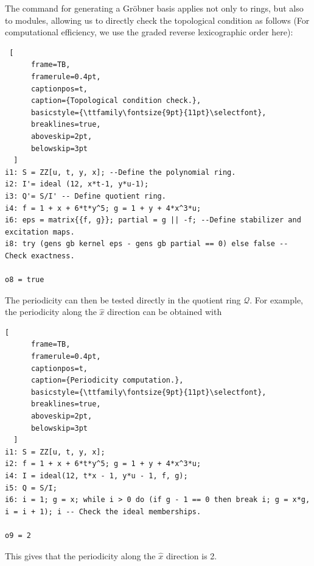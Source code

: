 \documentclass[aps,prb,english,superscriptaddress,twocolumn,tightenlines,showpacs,longbibliography,floatfix,amsfonts]{revtex4-2}
\begin{document}
The command for generating a Gr\"{o}bner basis applies not only to rings, but also to modules, allowing us to directly check the topological condition as follows (For computational efficiency, we use the graded reverse lexicographic order here):
\begin{lstlisting} [
      frame=TB,             
      framerule=0.4pt,
      captionpos=t,
      caption={Topological condition check.},
      basicstyle={\ttfamily\fontsize{9pt}{11pt}\selectfont},
      breaklines=true,
      aboveskip=2pt,        
      belowskip=3pt
  ]
i1: S = ZZ[u, t, y, x]; --Define the polynomial ring.
i2: I'= ideal (12, x*t-1, y*u-1);
i3: Q'= S/I' -- Define quotient ring.
i4: f = 1 + x + 6*t*y^5; g = 1 + y + 4*x^3*u;
i6: eps = matrix{{f, g}}; partial = g || -f; --Define stabilizer and excitation maps.
i8: try (gens gb kernel eps - gens gb partial == 0) else false -- Check exactness. 

o8 = true
\end{lstlisting}

The periodicity can then be tested directly in the quotient ring $\mathcal{Q}$. For example, the periodicity along the $\hat{x}$ direction can be obtained with
\begin{lstlisting}[
      frame=TB,             
      framerule=0.4pt,
      captionpos=t,
      caption={Periodicity computation.},
      basicstyle={\ttfamily\fontsize{9pt}{11pt}\selectfont},
      breaklines=true,
      aboveskip=2pt,        
      belowskip=3pt
  ]
i1: S = ZZ[u, t, y, x];
i2: f = 1 + x + 6*t*y^5; g = 1 + y + 4*x^3*u; 
i4: I = ideal(12, t*x - 1, y*u - 1, f, g); 
i5: Q = S/I;
i6: i = 1; g = x; while i > 0 do (if g - 1 == 0 then break i; g = x*g, i = i + 1); i -- Check the ideal memberships.

o9 = 2
\end{lstlisting}
This gives that the periodicity along the $\hat{x}$ direction is 2. 

\twocolumngrid


\end{document}
